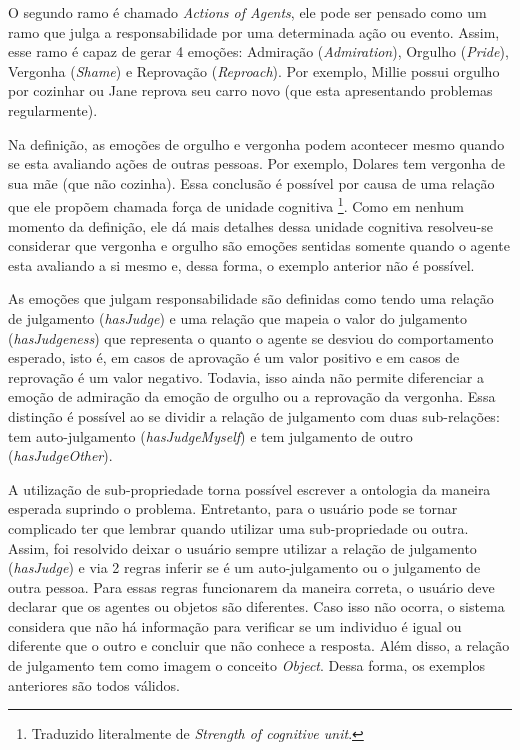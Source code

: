 O segundo ramo é chamado \emph{Actions of Agents}, ele pode ser pensado como
um ramo que julga a responsabilidade por uma determinada ação ou evento.
Assim, esse ramo é capaz de gerar 4 emoções: Admiração (\emph{Admiration}),
Orgulho (\emph{Pride}), Vergonha (\emph{Shame}) e Reprovação
(\emph{Reproach}). Por exemplo, Millie possui orgulho por cozinhar ou Jane
reprova seu carro novo (que esta apresentando problemas regularmente).

Na definição, as emoções de orgulho e vergonha podem acontecer mesmo quando se
esta avaliando ações de outras pessoas. Por exemplo, Dolares tem vergonha de
sua mãe (que não cozinha). Essa conclusão é possível por causa de uma relação
que ele propõem chamada força de unidade cognitiva \footnote{Traduzido
literalmente de \emph{Strength of cognitive unit}.}. Como em nenhum momento da
definição, ele dá mais detalhes dessa unidade cognitiva resolveu-se considerar
que vergonha e orgulho são emoções sentidas somente quando o agente esta
avaliando a si mesmo e, dessa forma, o exemplo anterior não é possível.

As emoções que julgam responsabilidade são definidas como tendo uma relação de
julgamento (\emph{hasJudge}) e uma relação que mapeia o valor do julgamento
(\emph{hasJudgeness}) que representa o quanto o agente se desviou do
comportamento esperado, isto é, em casos de aprovação é um valor positivo e em
casos de reprovação é um valor negativo. Todavia, isso ainda não permite
diferenciar a emoção de admiração da emoção de orgulho ou a reprovação da
vergonha. Essa distinção é possível ao se dividir a relação de julgamento com
duas sub-relações: tem auto-julgamento (\emph{hasJudgeMyself}) e tem
julgamento de outro (\emph{hasJudgeOther}).

A utilização de sub-propriedade torna possível escrever a ontologia da maneira
esperada suprindo o problema. Entretanto, para o usuário pode se tornar
complicado ter que lembrar quando utilizar uma sub-propriedade ou outra.
Assim, foi resolvido deixar o usuário sempre utilizar a relação de julgamento
(\emph{hasJudge}) e via 2 regras inferir se é um auto-julgamento ou o
julgamento de outra pessoa. Para essas regras funcionarem da maneira correta,
o usuário deve declarar que os agentes ou objetos são diferentes. Caso isso
não ocorra, o sistema considera que não há informação para verificar se um
individuo é igual ou diferente que o outro e concluir que não conhece a
resposta. Além disso, a relação de julgamento tem como imagem o conceito
\emph{Object}. Dessa forma, os exemplos anteriores são todos válidos.

